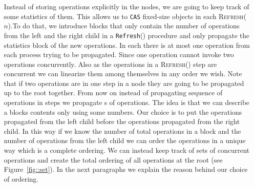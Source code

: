 \documentclass[10pt]{article}
\newcommand{\nf}[1]{{\normalfont{\texttt{#1}}}}
\theoremstyle{definition}
\begin{document}
Instead of storing operations explicitly in the nodes, we are going to keep track of some statistics of them. This allows us to \texttt{CAS} fixed-size objects in each \textsc{Refresh}($n$).To do that, we introduce blocks that only contain the number of operations from the left and the right child in a \texttt{Refresh}() procedure and only propagate the statistics block of the new operations. In each \nf{Refresh()} there is at most one operation from  each process trying to be propagated. Since one operation cannot invoke two operations concurrently. Also as the operations in a \textsc{Refresh()} step are concurrent we can linearize them  among themselves in any order we wish. Note that if two operations are in one \nf{Porpagate()} step in a node they are going to be propagated up to the root together. From now on instead of propagating sequence of operations in  \nf{Refresh} steps we propagate \nf{block}s of operations. The idea is that we can describe a blocks contents only using some numbers. Our choice is to put the operations propagated from the left child before the operations propagated from the right child. In this way if we know the number of total operations in a block and the number of operations from the left child we can order the operations in a unique way which is a complete ordering. We can instead keep track of sets of concurrent operations and create the total ordering of all operations at the root (see Figure~\ref{fig::set}). In the next paragraphs we explain the reason behind our choice of ordering.
\end{document}
